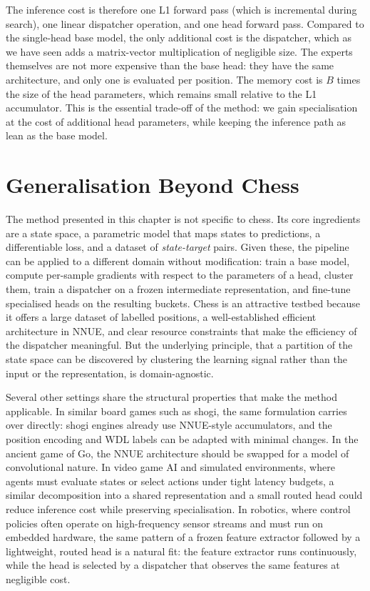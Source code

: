 The inference cost is therefore one L1 forward pass (which is incremental during search), one linear dispatcher operation, and one head forward pass. Compared to the single-head base model, the only additional cost is the dispatcher, which as we have seen adds a matrix-vector multiplication of negligible size. The experts themselves are not more expensive than the base head: they have the same architecture, and only one is evaluated per position. The memory cost is $B$ times the size of the head parameters, which remains small relative to the L1 accumulator. This is the essential trade-off of the method: we gain specialisation at the cost of additional head parameters, while keeping the inference path as lean as the base model.


\section{Generalisation Beyond Chess}

The method presented in this chapter is not specific to chess. Its core ingredients are a state space, a parametric model that maps states to predictions, a differentiable loss, and a dataset of \emph{state-target} pairs. Given these, the pipeline can be applied to a different domain without modification: train a base model, compute per-sample gradients with respect to the parameters of a head, cluster them, train a dispatcher on a frozen intermediate representation, and fine-tune specialised heads on the resulting buckets. Chess is an attractive testbed because it offers a large dataset of labelled positions, a well-established efficient architecture in NNUE, and clear resource constraints that make the efficiency of the dispatcher meaningful. But the underlying principle, that a partition of the state space can be discovered by clustering the learning signal rather than the input or the representation, is domain-agnostic.

Several other settings share the structural properties that make the method applicable. In similar board games such as shogi, the same formulation carries over directly: shogi engines already use NNUE-style accumulators, and the position encoding and WDL labels can be adapted with minimal changes. In the ancient game of Go, the NNUE architecture should be swapped for a model of convolutional nature. In video game AI and simulated environments, where agents must evaluate states or select actions under tight latency budgets, a similar decomposition into a shared representation and a small routed head could reduce inference cost while preserving specialisation. In robotics, where control policies often operate on high-frequency sensor streams and must run on embedded hardware, the same pattern of a frozen feature extractor followed by a lightweight, routed head is a natural fit: the feature extractor runs continuously, while the head is selected by a dispatcher that observes the same features at negligible cost.


